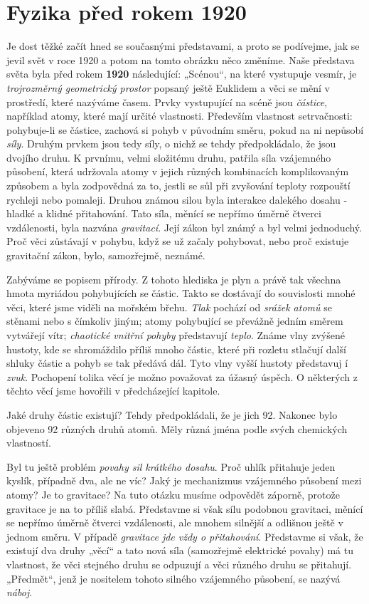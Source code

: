  \section{Fyzika před rokem 1920}
    Je dost těžké začít hned se současnými představami, a proto se podívejme, jak se jevil svět v roce 1920 a 
    potom na tomto obrázku něco změníme. Naše představa světa byla před rokem \textbf{1920} následující: 
    „Scénou“, na které vystupuje vesmír, je \emph{trojrozměrný geometrický prostor} popsaný ještě Euklidem a 
    věci se mění v prostředí, které nazýváme časem. Prvky vystupující na scéně jsou \emph{částice}, například 
    atomy, které mají určité vlastnosti. Především vlastnost setrvačnosti: pohybuje-li se částice, zachová si 
    pohyb v původním směru, pokud na ni nepůsobí \emph{síly}. Druhým prvkem jsou tedy síly, o nichž se tehdy 
    předpokládalo, že jsou dvojího druhu. K prvnímu, velmi složitému druhu, patřila síla vzájemného působení, 
    která udržovala atomy v jejich různých kombinacích komplikovaným způsobem a byla zodpovědná za to, jestli 
    se sůl při zvyšování teploty rozpouští rychleji nebo pomaleji. Druhou známou silou byla interakce 
    dalekého dosahu - hladké a klidné přitahování. Tato síla, měnící se nepřímo úměrně čtverci vzdálenosti, 
    byla nazvána \emph{gravitací}. Její zákon byl známý a byl velmi jednoduchý. Proč věci zůstávají v pohybu, 
    když se už začaly pohybovat, nebo proč existuje gravitační zákon, bylo, samozřejmě, neznámé.
    
    Zabýváme se popisem přírody. Z tohoto hlediska je plyn a právě tak všechna hmota myriádou pohybujících se 
    částic. Takto se dostávají do souvislosti mnohé věci, které jsme viděli na mořském břehu. \emph{Tlak} 
    pochází od \emph{srážek atomů} se stěnami nebo s čímkoliv jiným; atomy pohybující se převážně jedním 
    směrem vytvářejí vítr; \emph{chaotické vnitřní pohyby} představují \emph{teplo}. Známe vlny zvýšené 
    hustoty, kde se shromáždilo příliš mnoho částic, které při rozletu stlačují další shluky částic a pohyb 
    se tak předává dál. Tyto vlny vyšší hustoty představuj í \emph{zvuk}. Pochopení tolika věcí je možno 
    považovat za úžasný úspěch. O některých z těchto věcí jsme hovořili v předcházející kapitole.
    
    Jaké druhy částic existují? Tehdy předpokládali, že je jich 92. Nakonec bylo objeveno 92 různých druhů 
    atomů. Měly různá jména podle svých chemických vlastností.
    
    Byl tu ještě problém \emph{povahy sil krátkého dosahu}. Proč uhlík přitahuje jeden kyslík, případně dva, 
    ale ne víc? Jaký je mechanizmus vzájemného působení mezi atomy? Je to gravitace? Na tuto otázku musíme 
    odpovědět záporně, protože gravitace je na to příliš slabá. Představme si však sílu podobnou gravitaci, 
    měnící se nepřímo úměrně čtverci vzdálenosti, ale mnohem silnější a odlišnou ještě v jednom směru. V 
    případě \emph{gravitace jde vždy o přitahování}. Představme si však, že existují dva druhy „věcí“ a tato 
    nová síla  (samozřejmě elektrické povahy) má tu vlastnost, že věci stejného druhu se odpuzují a věci 
    různého druhu se přitahují. „Předmět“, jenž je nositelem tohoto silného vzájemného působení, se nazývá 
    \emph{náboj}.  
    
